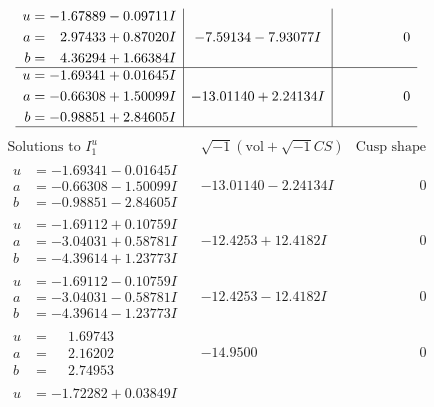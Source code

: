 \documentclass[1p]{elsarticle_modified}
\theoremstyle{definition}
\newcommand{\I}{\sqrt{-1}}
\begin{document}
$$\begin{array}{c|c|c}
\begin{aligned}
u &= -1.67889 - 0.09711 I \\
a &= \phantom{-}2.97433 + 0.87020 I \\
b &= \phantom{-}4.36294 + 1.66384 I\end{aligned}
 & -7.59134 - 7.93077 I & \phantom{-0.000000 } 0 \\ \hline\begin{aligned}
u &= -1.69341 + 0.01645 I \\
a &= -0.66308 + 1.50099 I \\
b &= -0.98851 + 2.84605 I\end{aligned}
 & -13.01140 + 2.24134 I & \phantom{-0.000000 } 0\\
 \hline 
 \end{array}$$\newpage$$\begin{array}{c|c|c}  
\text{Solutions to }I^u_{1}& \I (\text{vol} + \sqrt{-1}CS) & \text{Cusp shape}\\
 \hline 
\begin{aligned}
u &= -1.69341 - 0.01645 I \\
a &= -0.66308 - 1.50099 I \\
b &= -0.98851 - 2.84605 I\end{aligned}
 & -13.01140 - 2.24134 I & \phantom{-0.000000 } 0 \\ \hline\begin{aligned}
u &= -1.69112 + 0.10759 I \\
a &= -3.04031 + 0.58781 I \\
b &= -4.39614 + 1.23773 I\end{aligned}
 & -12.4253 + 12.4182 I & \phantom{-0.000000 } 0 \\ \hline\begin{aligned}
u &= -1.69112 - 0.10759 I \\
a &= -3.04031 - 0.58781 I \\
b &= -4.39614 - 1.23773 I\end{aligned}
 & -12.4253 - 12.4182 I & \phantom{-0.000000 } 0 \\ \hline\begin{aligned}
u &= \phantom{-}1.69743\phantom{ +0.000000I} \\
a &= \phantom{-}2.16202\phantom{ +0.000000I} \\
b &= \phantom{-}2.74953\phantom{ +0.000000I}\end{aligned}
 & -14.9500\phantom{ +0.000000I} & \phantom{-0.000000 } 0 \\ \hline\begin{aligned}
u &= -1.72282 + 0.03849 I \\

\end{aligned}
\end{array}$$
\end{document}
